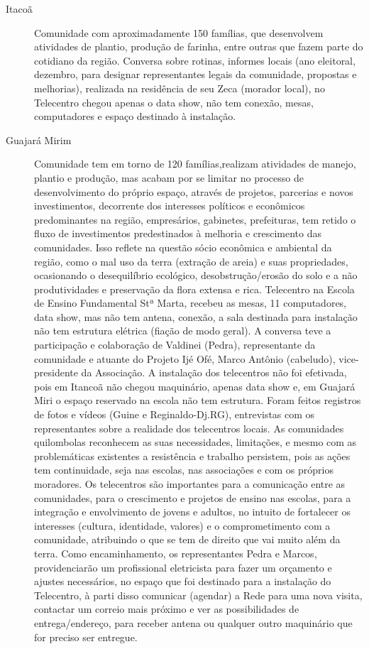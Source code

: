 \documentclass[a4paper, 11pt, oneside]{Relatorio_sem}  %
\begin{document}
\begin{description}
  \item[Itacoã] Comunidade com aproximadamente 150 famílias, que
    desenvolvem atividades de plantio, produção de farinha, entre
    outras que fazem parte do cotidiano da região. Conversa sobre
    rotinas, informes locais (ano eleitoral, dezembro, para designar
    representantes legais da comunidade, propostas e melhorias),
    realizada na residência de seu Zeca (morador local), no Telecentro
    chegou apenas o data show, não tem conexão, mesas, computadores e
    espaço destinado à instalação.
  \item[Guajará Mirim] Comunidade tem em torno de 120 famílias,realizam
    atividades de manejo, plantio e produção, mas acabam por se
    limitar no processo de desenvolvimento do próprio espaço, através
    de projetos, parcerias e novos investimentos, decorrente dos
    interesses políticos e econômicos predominantes na região,
    empresários, gabinetes, prefeituras, tem retido o fluxo de
    investimentos predestinados à melhoria e crescimento das
    comunidades. Isso reflete na questão sócio econômica e ambiental
    da região, como o mal uso da terra (extração de areia) e suas
    propriedades, ocasionando o desequilíbrio ecológico,
    desobstrução/erosão do solo e a não produtividades e preservação
    da flora extensa e rica.  Telecentro na Escola de Ensino
    Fundamental Stª Marta, recebeu as mesas, 11 computadores, data
    show, mas não tem antena, conexão, a sala destinada para
    instalação não tem estrutura elétrica (fiação de modo geral). A
    conversa teve a participação e colaboração de Valdinei (Pedra),
    representante da comunidade e atuante do Projeto Ijé Ofé, Marco
    Antônio (cabeludo), vice-presidente da Associação.  A instalação
    dos telecentros não foi efetivada, pois em Itancoã não chegou
    maquinário, apenas data show e, em Guajará Miri o espaço reservado
    na escola não tem estrutura. Foram feitos registros de fotos e
    vídeos (Guine e Reginaldo-Dj.RG), entrevistas com os
    representantes sobre a realidade dos telecentros locais. As
    comunidades quilombolas reconhecem as suas necessidades,
    limitações, e mesmo com as problemáticas existentes a resistência
    e trabalho persistem, pois as ações tem continuidade, seja nas
    escolas, nas associações e com os próprios moradores. Os
    telecentros são importantes para a comunicação entre as
    comunidades, para o crescimento e projetos de ensino nas escolas,
    para a integração e envolvimento de jovens e adultos, no intuito
    de fortalecer os interesses (cultura, identidade, valores) e o
    comprometimento com a comunidade, atribuindo o que se tem de
    direito que vai muito além da terra.  Como encaminhamento, os
    representantes Pedra e Marcos, providenciarão um profissional
    eletricista para fazer um orçamento e ajustes necessários, no
    espaço que foi destinado para a instalação do Telecentro, à parti
    disso comunicar (agendar) a Rede para uma nova visita, contactar
    um correio mais próximo e ver as possibilidades de
    entrega/endereço, para receber antena ou qualquer outro maquinário
    que for preciso ser
    entregue.
\end{description}
\end{document}
